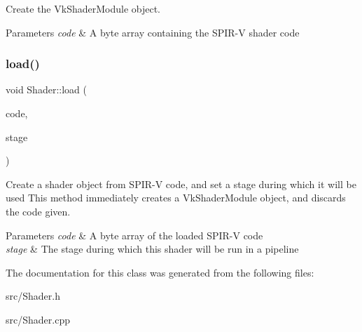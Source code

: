 Create the Vk\+Shader\+Module object. 


\begin{DoxyParams}{Parameters}
{\em code} & A byte array containing the S\+P\+I\+R-\/V shader code \\
\hline
\end{DoxyParams}
\mbox{\label{class_shader_a6dd75dee2ed363e1ecc5caed85fe92ba}} 
\subsubsection{\texorpdfstring{load()}{load()}}
{\footnotesize\ttfamily void Shader\+::load (\begin{DoxyParamCaption}\item[{const std\+::vector$<$ char $>$ \&}]{code,  }\item[{Vk\+Shader\+Stage\+Flag\+Bits}]{stage }\end{DoxyParamCaption})}



Create a shader object from S\+P\+I\+R-\/V code, and set a stage during which it will be used This method immediately creates a Vk\+Shader\+Module object, and discards the code given. 


\begin{DoxyParams}{Parameters}
{\em code} & A byte array of the loaded S\+P\+I\+R-\/V code \\
\hline
{\em stage} & The stage during which this shader will be run in a pipeline \\
\hline
\end{DoxyParams}


The documentation for this class was generated from the following files\+:\begin{DoxyCompactItemize}
\item 
src/Shader.\+h\item 
src/Shader.\+cpp\end{DoxyCompactItemize}
